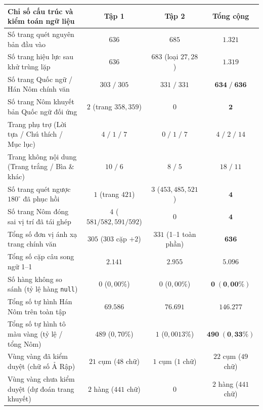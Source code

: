 \begin{table}[H]
    \centering
    \footnotesize
    \renewcommand{\arraystretch}{1.22}
    \begin{tabularx}{\textwidth}{X c c c}
        \toprule
        \textbf{Chỉ số cấu trúc và kiểm toán ngữ liệu} & \textbf{Tập 1} & \textbf{Tập 2} & \textbf{Tổng cộng} \\
        \midrule
        Số trang quét nguyên bản đầu vào & $636$ & $685$ & $1.321$ \\
        Số trang hiệu lực sau khử trùng lặp & $636$ & $683$ (loại $27, 28$) & $\mathbf{1.319}$ \\
        Số trang Quốc ngữ / Hán Nôm chính văn & $303 \;/\; 305$ & $331 \;/\; 331$ & $\mathbf{634 \;/\; 636}$ \\
        Số trang Nôm khuyết bản Quốc ngữ đối ứng & $2$ (trang $358, 359$) & $0$ & $\mathbf{2}$ \\
        Trang phụ trợ (Lời tựa / Chú thích / Mục lục) & $4 \;/\; 1 \;/\; 7$ & $0 \;/\; 1 \;/\; 7$ & $4 \;/\; 2 \;/\; 14$ \\
        Trang không nội dung (Trang trắng / Bìa \& khác) & $10 \;/\; 6$ & $8 \;/\; 5$ & $18 \;/\; 11$ \\
        Số trang quét ngược $180^\circ$ đã phục hồi & $1$ (trang $421$) & $3$ ($453, 485, 521$) & $\mathbf{4}$ \\
        Số trang Nôm đóng sai vị trí đã tái ghép & $4$ ($581/582, 591/592$) & $0$ & $\mathbf{4}$ \\
        Tổng số đơn vị ánh xạ trang chính văn & $305$ ($303$ cặp $+ 2$) & $331$ (1--1 toàn phần) & $\mathbf{636}$ \\
        \midrule
        Tổng số cặp câu song ngữ 1--1 & $2.141$ & $2.955$ & $\mathbf{5.096}$ \\
        Số hàng không so sánh (tỷ lệ hàng \texttt{null}) & $0$ ($0{,}00\%$) & $0$ ($0{,}00\%$) & $\mathbf{0\;(0{,}00\%)}$ \\
        Tổng số tự hình Hán Nôm trên toàn tập & $69.586$ & $76.691$ & $\mathbf{146.277}$ \\
        Tổng số tự hình tô màu vàng (tỷ lệ / tổng Nôm) & $489$ ($0{,}70\%$) & $1$ ($0{,}0013\%$) & $\mathbf{490\;(0{,}33\%)}$ \\
        \hspace{1em}Vùng vàng đã kiểm duyệt (chữ số Ả Rập) & $21$ cụm ($48$ chữ) & $1$ cụm ($1$ chữ) & $22$ cụm ($49$ chữ) \\
        \hspace{1em}Vùng vàng chưa kiểm duyệt (dự đoán trang khuyết) & $2$ hàng ($441$ chữ) & $0$ & $2$ hàng ($441$ chữ) \\

\end{tabularx}
\end{table}
